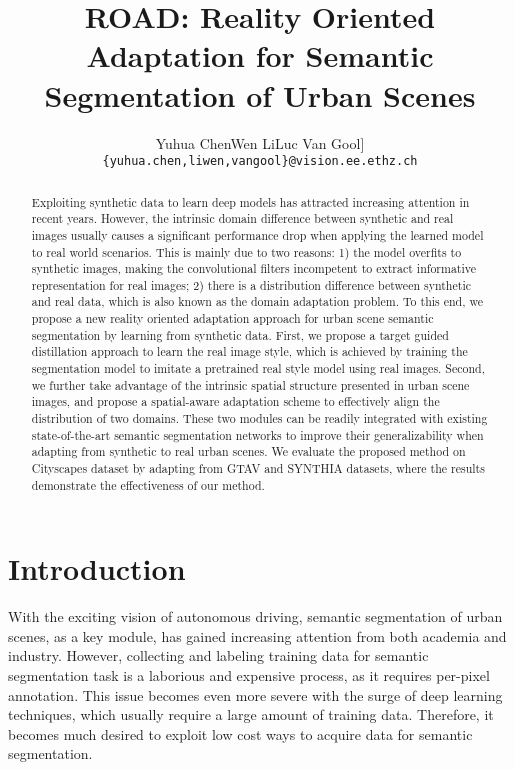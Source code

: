 \documentclass[10pt,twocolumn,letterpaper]{article}
\begin{document}
\title{ROAD: Reality Oriented Adaptation for Semantic Segmentation of Urban Scenes}

\author{Yuhua Chen\hspace{10mm}Wen Li\hspace{10mm}Luc Van Gool\-1.5pt]
{\tt\small \{yuhua.chen,liwen,vangool\}@vision.ee.ethz.ch}
}

\maketitle


\begin{abstract}

Exploiting synthetic data to learn deep models has attracted increasing attention in recent years. However, the intrinsic domain difference between synthetic and real images usually causes a significant performance drop when applying the learned model to real world scenarios. This is mainly due to two reasons: 1) the model overfits to synthetic images, making the convolutional filters incompetent to extract informative representation for real images; 2) there is a distribution difference between synthetic and real data, which is also known as the domain adaptation problem. To this end, we propose a new reality oriented adaptation approach for urban scene semantic segmentation by learning from synthetic data. First, we propose a target guided distillation approach to learn the real image style, which is achieved by training the segmentation model to imitate a pretrained real style model using real images. Second, we further take advantage of the intrinsic spatial structure presented in urban scene images, and propose a spatial-aware adaptation scheme to effectively align the distribution of two domains. These two modules can be readily integrated with existing state-of-the-art semantic segmentation networks to improve their generalizability when adapting from synthetic to real urban scenes. We evaluate the proposed method on Cityscapes dataset by adapting from GTAV and SYNTHIA datasets, where the results demonstrate the effectiveness of our method.
\end{abstract}

\vspace{-2mm}
\section{Introduction}
With the exciting vision of autonomous driving, semantic segmentation of urban scenes, as a key module, has gained increasing attention from both academia and industry. However, collecting and labeling training data for semantic segmentation task is a laborious and expensive process, as it requires per-pixel annotation. This issue becomes even more severe with the surge of deep learning techniques, which usually require a large amount of training data. Therefore, it becomes much desired to exploit low cost ways to acquire data for semantic segmentation.
\end{document}
